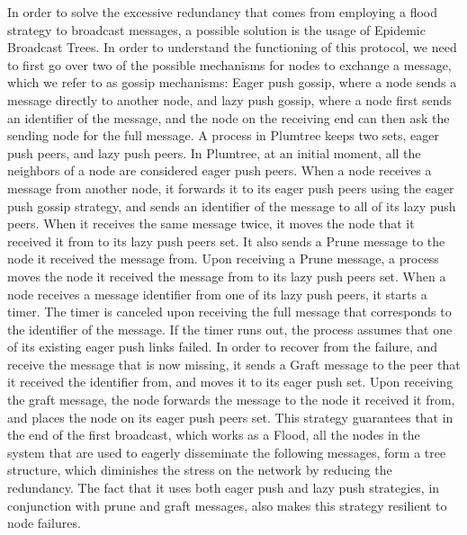 \documentclass[sigconf]{acmart}
\begin{document}
In order to solve the excessive redundancy that comes from employing a flood strategy to broadcast messages, a possible solution is the usage of Epidemic Broadcast Trees.
In order to understand the functioning of this protocol, we need to first go over two of the possible mechanisms for nodes to exchange a message, which we refer to as gossip mechanisms:
Eager push gossip, where a node sends a message directly to another node, and lazy push gossip, where a node first sends an identifier of the message, and the node on the receiving end can then ask the sending node for the full message.
A process in Plumtree keeps two sets, eager push peers, and lazy push peers.
In Plumtree, at an initial moment, all the neighbors of a node are considered eager push peers. When a node receives a message from another node, it forwards it to its eager push peers using the eager push gossip strategy, and sends an identifier of the message to all of its lazy push peers. When it receives the same message twice, it moves the node that it received it from to its lazy push peers set. It also sends a Prune message to the node it received the message from. Upon receiving a Prune message, a process moves the node it received the message from to its lazy push peers set.
When a node receives a message identifier from one of its lazy push peers, it starts a timer. The timer is canceled upon receiving the full message that corresponds to the identifier of the message. If the timer runs out, the process assumes that one of its existing eager push links failed. In order to recover from the failure, and receive the message that is now missing, it sends a Graft message to the peer that it received the identifier from, and moves it to its eager push set. Upon receiving the graft message, the node forwards the message to the node it received it from, and places the node on its eager push peers set.
This strategy guarantees that in the end of the first broadcast, which works as a Flood, all the nodes in the system that are used to eagerly disseminate the following messages, form a tree structure, which diminishes the stress on the network by reducing the redundancy.
The fact that it uses both eager push and lazy push strategies, in conjunction with prune and graft messages, also makes this strategy resilient to node failures.

\end{document}
